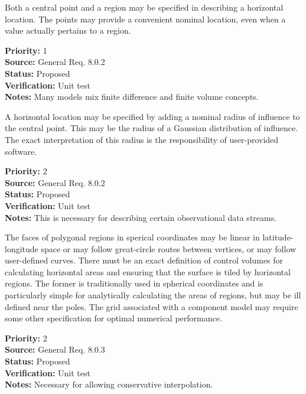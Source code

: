 
  Both a central point and a region may be specified in describing a horizontal
location.  The points may provide a convenient nominal location, even when
a value actually pertains to a region.
\begin{reqlist}
{\bf Priority:} 1 \\
{\bf Source:} General Req. 8.0.2 \\
{\bf Status:} Proposed \\
{\bf Verification:} Unit test\\
{\bf Notes:} Many models mix finite difference and finite volume concepts.
\end{reqlist}


  A horizontal location may be specified by adding a nominal radius of
influence to the central point.  This may be the radius of a Gaussian
distribution of influence. The exact interpretation of this radius is
the responsibility of user-provided software.
\begin{reqlist}
{\bf Priority:} 2 \\
{\bf Source:} General Req. 8.0.2 \\
{\bf Status:} Proposed \\
{\bf Verification:} Unit test\\
{\bf Notes:} This is necessary for describing certain observational data streams.
\end{reqlist}



The faces of polygonal regions in sperical coordinates may be linear in
latitude-longitude space or may follow great-circle routes between vertices, or
may follow user-defined curves.  There must be an exact definition of control
volumes for calculating horizontal areas and ensuring that the surface is tiled
by horizontal regions. The former is traditionally used in spherical
coordinates and is particularly simple for analytically calculating the areas
of regions, but may be ill defined near the poles.  The grid associated with a
component model may require some other specification for optimal numerical
performance.
\begin{reqlist}
{\bf Priority:} 2 \\
{\bf Source:} General Req. 8.0.3 \\
{\bf Status:} Proposed \\
{\bf Verification:} Unit test\\
{\bf Notes:} Necessary for allowing conservative interpolation.
\end{reqlist}


